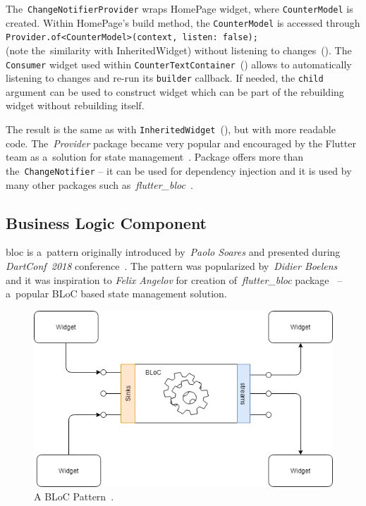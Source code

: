 The~\verb|ChangeNotifierProvider| wraps HomePage widget, where \verb|CounterModel| is created. Within HomePage's build method, the \verb|CounterModel| is accessed through \verb|Provider.of<CounterModel>(context, listen: false);| \\(note the~similarity with InheritedWidget) without listening to changes~(). The \verb|Consumer| widget used within \verb|CounterTextContainer|~() allows to automatically listening to changes and re-run its \verb|builder| callback. If needed, the \verb|child| argument can be used to construct widget which can be part of the rebuilding widget without rebuilding itself. 

The result is the same as with \verb|InheritedWidget|~(), but with more readable code. The~\textit{Provider} package became very popular and encouraged by the Flutter team as a~solution for state management~\cite{flutter-simple-state-management}. Package offers more than the~\verb|ChangeNotifier| -- it can be used for dependency injection and it is used by many other packages such as~\textit{flutter\_bloc}~\cite{package-bloc}.
\subsection{Business Logic Component}
\gls{bloc} is a~pattern originally introduced by~\textit{Paolo Soares} and presented during \textit{DartConf~2018} conference~\cite{bloc-pattern-youtube}. The pattern was popularized by~\textit{Didier Boelens}~\cite{reactive-didier} and it was inspiration to \textit{Felix Angelov} for creation of~\textit{flutter\_bloc} package~\cite{package-bloc} -- a~popular BLoC based state management solution.

\begin{figure}[ht]
    \centering
    \includegraphics[width=0.6\linewidth]{img/flutter/bloc_pattern.png}
    \caption{A BLoC Pattern~\cite{notion-widget-didier}.}
    \label{fig:bloc-pattern}
\end{figure}


